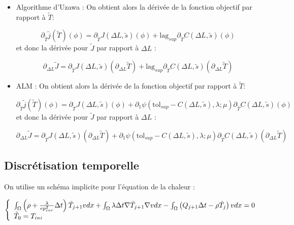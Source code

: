 \documentclass[11pt,a4paper]{article}
\begin{document}
\begin{itemize}
	\item Algorithme d'Uzawa : On obtient alors la dérivée de la fonction objectif par rapport à $\tilde{T}$:
	
	\begin{equation}
	\partial_{\tilde{T}}\tilde{j}(\tilde{T})(\phi)= \partial_{\tilde{T}}J(\Delta L,\tilde{s})(\phi)+ \textrm{lag}_{sup} \partial_{\tilde{T}}C(\Delta L,\tilde{s})(\phi)
	\end{equation}
	et donc la dérivée pour $\tilde{J}$ par rapport à $\Delta L$ :
	
	\begin{equation}
	\partial_{\Delta L}\tilde{J}= \partial_{\tilde{T}}J(\Delta L,\tilde{s})(\partial_{\Delta L}\tilde{T})+ \textrm{lag}_{sup} \partial_{\tilde{T}}C(\Delta L,\tilde{s})(\partial_{\Delta L}\tilde{T})
	\end{equation}
	
	\item ALM : On obtient alors la dérivée de la fonction objectif par rapport à $\tilde{T}$:
	
	\begin{equation}
	\partial_{\tilde{T}}\tilde{j}(\tilde{T})(\phi)= \partial_{\tilde{T}}J(\Delta L,\tilde{s})(\phi)+\partial_1\psi\left(\textrm{tol}_{sup}-C(\Delta L,\tilde{s}),\lambda;\mu\right) \partial_{\tilde{T}}C(\Delta L,\tilde{s})(\phi)
	\end{equation}
	et donc la dérivée pour $\tilde{J}$ par rapport à $\Delta L$ :
	
	\begin{equation}
	\partial_{\Delta L}\tilde{J}= \partial_{\tilde{T}}J(\Delta L,\tilde{s})(\partial_{\Delta L}\tilde{T})+ \partial_1\psi\left(\textrm{tol}_{sup}-C(\Delta L,\tilde{s}),\lambda;\mu\right) \partial_{\tilde{T}}C(\Delta L,\tilde{s})(\partial_{\Delta L}\tilde{T})
	\end{equation}
\end{itemize}



\subsection*{Discrétisation temporelle}

On utilise un schéma implicite pour l'équation de la chaleur :

\begin{equation}
\left\{\begin{array}{l}
	\int_{\Omega} \left(\rho+\frac{\lambda}{ep^2_{car}}\Delta t\right)\tilde{T}_{j+1}vdx+\int_{\Omega} \lambda\Delta t \nabla\tilde{T}_{j+1}\nabla vdx-\int_{\Omega}\left(Q_{j+1}\Delta t-\rho\tilde{T}_j\right)vdx=0 \\
	\tilde{T}_0=T_{ini}
\end{array}\right.
\end{equation}
\end{document}
